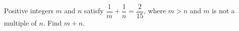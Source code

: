 Positive integers $m$ and $n$ satisfy $\dfrac{1}{m}+\dfrac{1}{n}=\dfrac{2}{15}$, where $m>n$ and $m$ is not a multiple of $n$. Find $m+n$.
